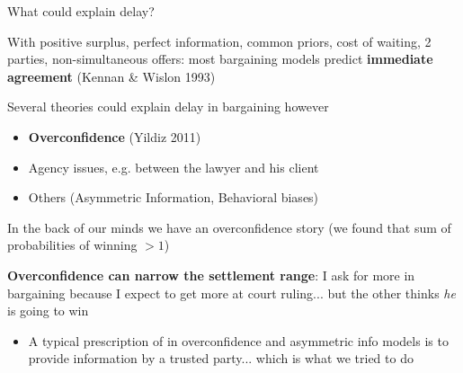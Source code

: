 \documentclass[9pt]{beamer}
\begin{document}
\begin{frame}{What could explain delay?}

With positive surplus, perfect information, common priors, cost of waiting, 2 parties, non-simultaneous offers:  most bargaining models predict \textbf{immediate agreement} (Kennan \& Wislon 1993)

\pause
\vspace{.2in}
Several theories could explain delay in bargaining however
    \begin{itemize}
        \item \textbf{Overconfidence} (Yildiz 2011)
        \item Agency issues, e.g. between the lawyer and his client
        \item Others (Asymmetric Information, Behavioral biases)
    \end{itemize}
\vspace{.1in}


In the back of our minds we have an overconfidence story (we found that sum of probabilities of winning $>1$)



\vspace{.15in}

\pause
\textbf{Overconfidence can narrow the settlement range}: I ask for more in bargaining because I expect to get more at court ruling... but the other thinks \textit{he} is going to win


\begin{itemize}
    \item \alert{A typical prescription} of in overconfidence and asymmetric info models is to \alert{provide information} by a trusted party... which is what we tried to do
\end{itemize}


\end{frame}
\end{document}
